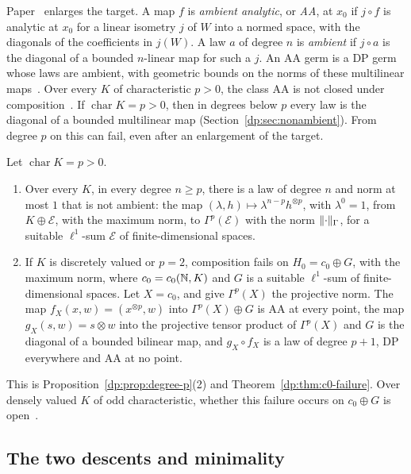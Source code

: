 Paper~\cite{I} enlarges the target. A map $f$ is \emph{ambient analytic}, or \emph{AA}, at $x_0$ if $j\circ f$ is analytic at $x_0$ for a linear isometry $j$ of $W$ into a normed space, with the diagonals of the coefficients in $j(W)$. A law $a$ of degree $n$ is \emph{ambient} if $j\circ a$ is the diagonal of a bounded $n$-linear map for such a $j$. An AA germ is a DP germ whose laws are ambient, with geometric bounds on the norms of these multilinear maps~\cite[Proposition~14.9]{I}. Over every $K$ of characteristic $p>0$, the class AA is not closed under composition~\cite[Theorem~14.17]{I}. If $\operatorname{char}K=p>0$, then in degrees below $p$ every law is the diagonal of a bounded multilinear map (Section~\ref{dp:sec:nonambient}). From degree $p$ on this can fail, even after an enlargement of the target.

\begin{introtheorem}\label{dp:intro:A}
Let $\operatorname{char}K=p>0$.
\begin{enumerate}
\item Over every $K$, in every degree $n\ge p$, there is a law of degree $n$ and norm at most $1$ that is not ambient: the map $(\lambda,h)\mapsto\lambda^{n-p}h^{\otimes p}$, with $\lambda^0=1$, from $K\oplus\mathcal E$, with the maximum norm, to $\Gamma^p(\mathcal E)$ with the norm $\lVert \cdot\rVert_\Gamma$, for a suitable $\ell^1$-sum $\mathcal E$ of finite-dimensional spaces.
\item If $K$ is discretely valued or $p=2$, composition fails on $H_0=c_0\oplus G$, with the maximum norm, where $c_0=c_0(\mathbb N,K)$ and $G$ is a suitable $\ell^1$-sum of finite-dimensional spaces. Let $X=c_0$, and give $\Gamma^p(X)$ the projective norm. The map $f_X(x,w)=(x^{\otimes p},w)$ into $\Gamma^p(X)\oplus G$ is AA at every point, the map $g_X(s,w)=s\otimes w$ into the projective tensor product of $\Gamma^p(X)$ and $G$ is the diagonal of a bounded bilinear map, and $g_X\circ f_X$ is a law of degree $p+1$, DP everywhere and AA at no point.
\end{enumerate}
\end{introtheorem}

This is Proposition~\ref{dp:prop:degree-p}(2) and Theorem~\ref{dp:thm:c0-failure}. Over densely valued $K$ of odd characteristic, whether this failure occurs on $c_0\oplus G$ is open~\cite[Remark~14.20]{I}.

\subsection*{The two descents and minimality}

